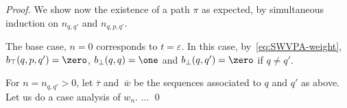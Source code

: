 \begin{proof}
\noindent
We show now the existence of a path $\pi$ as expected, %
by simultaneous induction on $n_{q, q'}$ and $n_{q, p, q'}$.

\noindent
The base case, $n = 0$ corresponds to $t = \varepsilon$. 
In this case, by~\eqref{eq:SWVPA-weight}, $b_\top(q, p, q') = \zero$,
$b_\bot(q, q) = \one$ and $b_\bot(q, q') = \zero$ if $q \neq q'$.

\noindent
For $n = n_{q, q'} > 0$, let $\bar\tau$ and~$\bar{w}$
be the sequences associated to $q$ and $q'$ as above.
Let us do a case analysis of $w_n$.
... \qed
\end{proof}